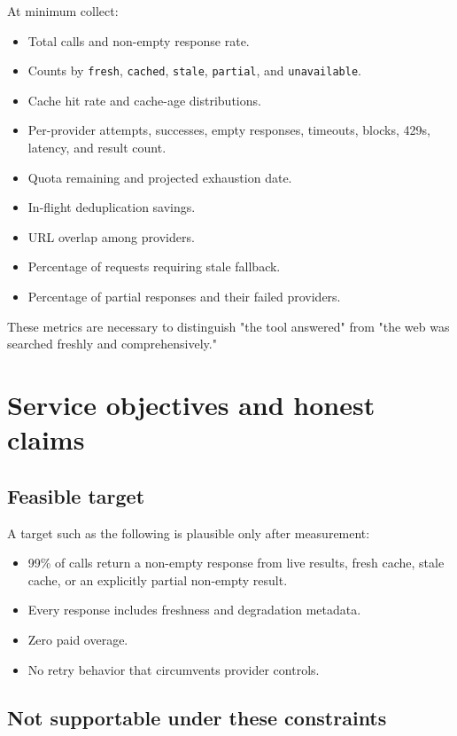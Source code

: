 \documentclass[11pt]{article}
\begin{document}
At minimum collect:

\begin{itemize}
\item Total calls and non-empty response rate.
\item Counts by \texttt{fresh}, \texttt{cached}, \texttt{stale}, \texttt{partial}, and \texttt{unavailable}.
\item Cache hit rate and cache-age distributions.
\item Per-provider attempts, successes, empty responses, timeouts, blocks, 429s,
latency, and result count.
\item Quota remaining and projected exhaustion date.
\item In-flight deduplication savings.
\item URL overlap among providers.
\item Percentage of requests requiring stale fallback.
\item Percentage of partial responses and their failed providers.
\end{itemize}

These metrics are necessary to distinguish "the tool answered" from "the web
was searched freshly and comprehensively."
\section*{Service objectives and honest claims}
\label{sec:org2edb433}

\subsection*{Feasible target}
\label{sec:orgd617df4}

A target such as the following is plausible only after measurement:

\begin{itemize}
\item 99\% of calls return a non-empty response from live results, fresh cache, stale
cache, or an explicitly partial non-empty result.
\item Every response includes freshness and degradation metadata.
\item Zero paid overage.
\item No retry behavior that circumvents provider controls.
\end{itemize}
\subsection*{Not supportable under these constraints}
\label{sec:org05eb1b4}
\end{document}
